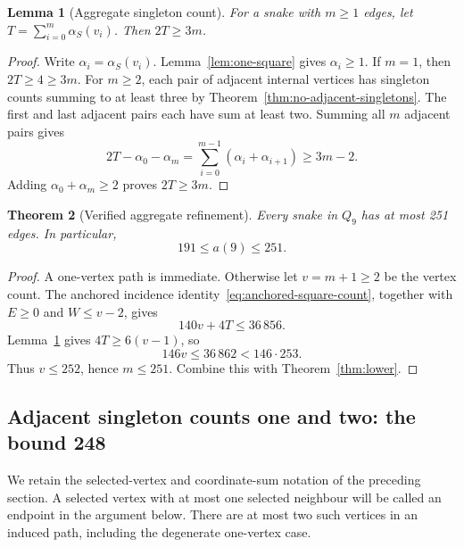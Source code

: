 \documentclass[11pt,a4paper]{article}
\newtheorem{theorem}{Theorem}[section]
\newtheorem{lemma}[theorem]{Lemma}
\theoremstyle{definition}
\theoremstyle{remark}
\newcommand{\Q}{Q}
\begin{document}
\begin{lemma}[Aggregate singleton count]\label{lem:aggregate-singleton}
For a snake with $m\ge1$ edges, let $T=\sum_{i=0}^{m}\alpha_S(v_i)$. Then $2T\ge3m$.
\end{lemma}
\begin{proof}
Write $\alpha_i=\alpha_S(v_i)$. Lemma~\ref{lem:one-square} gives $\alpha_i\ge1$. If $m=1$, then $2T\ge4\ge3m$. For $m\ge2$, each pair of adjacent internal vertices has singleton counts summing to at least three by Theorem~\ref{thm:no-adjacent-singletons}. The first and last adjacent pairs each have sum at least two. Summing all $m$ adjacent pairs gives
\[
2T-\alpha_0-\alpha_m
=\sum_{i=0}^{m-1}(\alpha_i+\alpha_{i+1})
\ge 3m-2.
\]
Adding $\alpha_0+\alpha_m\ge2$ proves $2T\ge3m$.
\end{proof}

\begin{theorem}[Verified aggregate refinement]\label{thm:upper251}
Every snake in $\Q_9$ has at most 251 edges. In particular,
\[
\boxed{191\le a(9)\le251.}
\]
\end{theorem}
\begin{proof}
A one-vertex path is immediate. Otherwise let $v=m+1\ge2$ be the vertex count. The anchored incidence identity~\eqref{eq:anchored-square-count}, together with $E\ge0$ and $W\le v-2$, gives
\[
140v+4T\le36\,856.
\]
Lemma~\ref{lem:aggregate-singleton} gives $4T\ge6(v-1)$, so
\[
146v\le36\,862<146\cdot253.
\]
Thus $v\le252$, hence $m\le251$. Combine this with Theorem~\ref{thm:lower}.
\end{proof}


\subsection{Adjacent singleton counts one and two: the bound 248}
We retain the selected-vertex and coordinate-sum notation of the preceding section. A selected vertex with at most one selected neighbour will be called an endpoint in the argument below. There are at most two such vertices in an induced path, including the degenerate one-vertex case.
\end{document}
